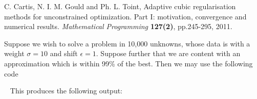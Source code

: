 \documentclass{galahad}
\begin{document}
\noindent
C. Cartis, N. I. M. Gould and Ph. L. Toint,
Adaptive cubic regularisation methods for unconstrained
optimization. Part {I}: motivation, convergence and numerical results.
{\em Mathematical Programming} {\bf 127(2)}, pp.245-295, 2011.


\galexample
Suppose we wish to solve a problem in 10,000 unknowns, whose data is
with a weight $\sigma = 10$ and shift $\epsilon = 1$.
Suppose further that we are content with an approximation which is within 99\%
of the best. Then we may use the following code

{\tt \small
\VerbatimInput{\packageexample}
}
\noindent
This produces the following output:
{\tt \small
\VerbatimInput{\packageresults}
}
\end{document}
